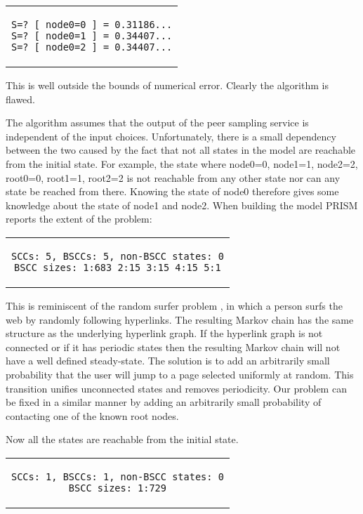 \documentclass[a4paper,10pt]{article}
\newcommand{\code}[1]{
  \footnotesize
  
}
\newcommand{\prismmodel}[1]{
  \begin{quotation}
  \code{../models/#1.sm}
  \end{quotation}
}
\newenvironment{prismprop}[0]{
  \begin{center}
  \begin{tabular}{c}
  \footnotesize
}{
  \end{tabular}
  \end{center}
}
\begin{document}
\begin{prismprop}
\begin{lstlisting}
S=? [ node0=0 ] = 0.31186...
S=? [ node0=1 ] = 0.34407...
S=? [ node0=2 ] = 0.34407...
\end{lstlisting}
\end{prismprop}

This is well outside the bounds of numerical error. Clearly the algorithm is flawed.

The algorithm assumes that the output of the peer sampling service is independent of the input choices. Unfortunately, there is a small dependency between the two caused by the fact that not all states in the model are reachable from the initial state. For example, the state where node0=0, node1=1, node2=2, root0=0, root1=1, root2=2 is not reachable from any other state nor can any state be reached from there. Knowing the state of node0 therefore gives some knowledge about the state of node1 and node2. When building the model PRISM reports the extent of the problem:

\begin{prismprop}
\begin{lstlisting}
SCCs: 5, BSCCs: 5, non-BSCC states: 0
BSCC sizes: 1:683 2:15 3:15 4:15 5:1
\end{lstlisting}
\end{prismprop}

This is reminiscent of the random surfer problem \cite{random_surfer}, in which a person surfs the web by randomly following hyperlinks. The resulting Markov chain has the same structure as the underlying hyperlink graph. If the hyperlink graph is not connected or if it has periodic states then the resulting Markov chain will not have a well defined steady-state. The solution is to add an arbitrarily small probability that the user will jump to a page selected uniformly at random. This transition unifies unconnected states and removes periodicity. Our problem can be fixed in a similar manner by adding an arbitrarily small probability of contacting one of the known root nodes.

\prismmodel{ctmc_full}

Now all the states are reachable from the initial state.

\begin{prismprop}
\begin{lstlisting}
SCCs: 1, BSCCs: 1, non-BSCC states: 0
BSCC sizes: 1:729
\end{lstlisting}
\end{prismprop}
\end{document}
